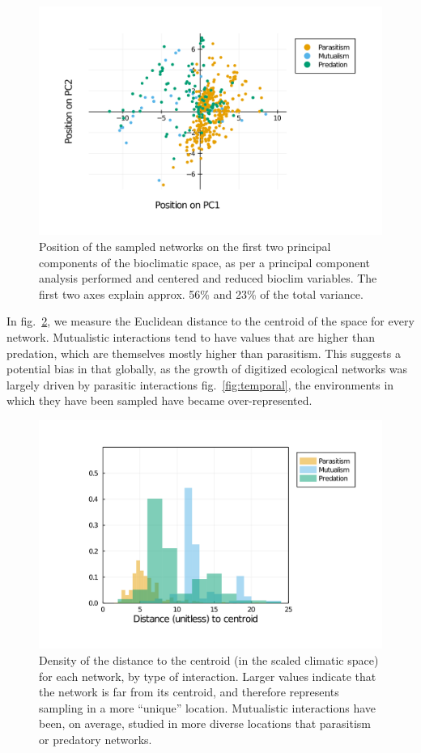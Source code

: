 \documentclass[10pt,oneside]{article}
\makeatletter
\def\maxwidth{\ifdim\Gin@nat@width>\linewidth\linewidth
\else\Gin@nat@width\fi}
\let\Oldincludegraphics\includegraphics
\renewcommand{\includegraphics}[1]{\Oldincludegraphics[width=\maxwidth]{#1}}
\makeatother
\begin{document}
\begin{figure}
\hypertarget{fig:pca}{%
\centering
\includegraphics{figures/networks_pca.png}
\caption{Position of the sampled networks on the first two principal
components of the bioclimatic space, as per a principal component
analysis performed and centered and reduced bioclim variables. The first
two axes explain approx. 56\% and 23\% of the total
variance.}\label{fig:pca}
}
\end{figure}

In fig.~\ref{fig:ecc}, we measure the Euclidean distance to the centroid
of the space for every network. Mutualistic interactions tend to have
values that are higher than predation, which are themselves mostly
higher than parasitism. This suggests a potential bias in that globally,
as the growth of digitized ecological networks was largely driven by
parasitic interactions fig.~\ref{fig:temporal}, the environments in
which they have been sampled have became over-represented.

\begin{figure}
\hypertarget{fig:ecc}{%
\centering
\includegraphics{figures/distance_to_centroid.png}
\caption{Density of the distance to the centroid (in the scaled climatic
space) for each network, by type of interaction. Larger values indicate
that the network is far from its centroid, and therefore represents
sampling in a more ``unique'' location. Mutualistic interactions have
been, on average, studied in more diverse locations that parasitism or
predatory networks.}\label{fig:ecc}
}
\end{figure}
\end{document}
